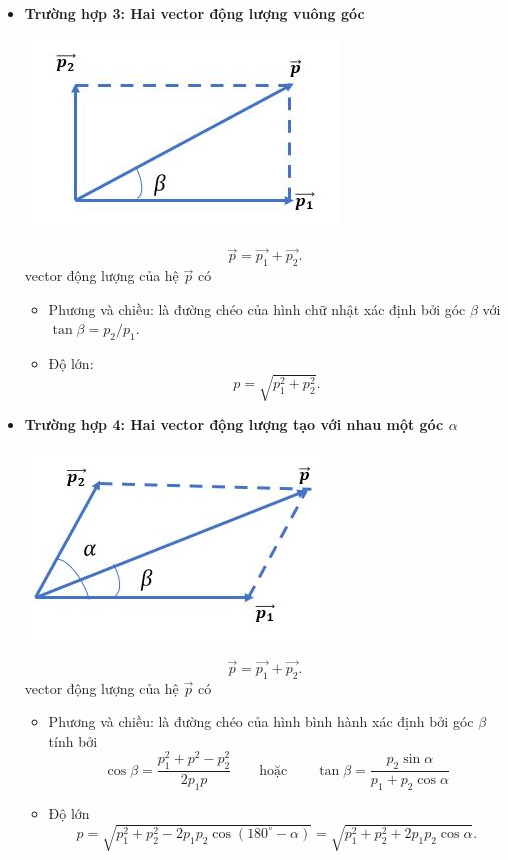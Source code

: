 \begin{itemize}
	\item \textbf{Trường hợp 3: Hai vector động lượng vuông góc}
	\begin{center}
		\includegraphics[scale=0.6]{../figs/VN10-PH-29-L-021-2-3.JPG}
	\end{center}
	\begin{equation*}
		\vec {p} = \vec {p_1} + \vec{p_2}.
	\end{equation*}
	vector động lượng của hệ $\vec{p}$ có 
	\begin{itemize}
		\item Phương và chiều: là đường chéo của hình chữ nhật xác định bởi góc $\beta$ với $\tan \beta = {p_2}/{p_1}.$
		\item Độ lớn: $$p = \sqrt {p_1^2+p^2_2}.$$
	\end{itemize}
	
	\item \textbf{Trường hợp 4: Hai vector động lượng tạo với nhau một góc $\alpha$}
	\begin{center}
		\includegraphics[scale=0.6]{../figs/VN10-PH-29-L-021-2-4.JPG}
	\end{center}
	\begin{equation*}
		\vec {p} = \vec {p_1} + \vec{p_2}.
	\end{equation*}
	vector động lượng của hệ $\vec{p}$ có 
	\begin{itemize}
		\item Phương và chiều: là đường chéo của hình bình hành xác định bởi góc $\beta$ tính bởi 
		\begin{equation*}
			\cos \beta = \dfrac  {p_1^2+p^2-p_2^2}{2p_1p} \qquad\text{hoặc}\qquad
			\tan\beta = \dfrac{p_2\sin\alpha}{p_1+p_2\cos\alpha}
		\end{equation*}
		\item Độ lớn  $$p = \sqrt{p^2_1+p^2_2 - 2p_1p_2 \cos (180^\circ - \alpha)} = \sqrt{p^2_1+p^2_2 + 2p_1p_2 \cos  \alpha}.$$
	\end{itemize}
	

\end{itemize}
